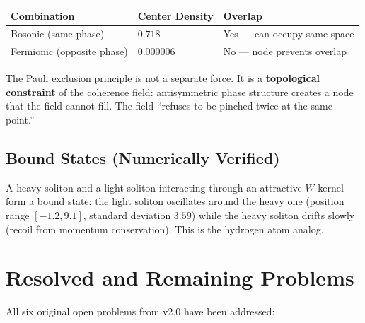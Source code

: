 \documentclass[11pt, a4paper]{article}
\begin{document}
\begin{center}
\begin{tabular}{@{}lll@{}}
\toprule
\textbf{Combination} & \textbf{Center Density} & \textbf{Overlap} \\
\midrule
Bosonic (same phase)     & $0.718$    & Yes --- can occupy same space \\
Fermionic (opposite phase) & $0.000006$ & No --- node prevents overlap \\
\bottomrule
\end{tabular}
\end{center}

The Pauli exclusion principle is not a separate force. It is a
\textbf{topological constraint} of the coherence field: antisymmetric
phase structure creates a node that the field cannot fill. The field
``refuses to be pinched twice at the same point.''

\subsection{Bound States (Numerically Verified)}

A heavy soliton and a light soliton interacting through an attractive
$W$ kernel form a bound state: the light soliton oscillates around
the heavy one (position range $[-1.2, 9.1]$, standard deviation $3.59$)
while the heavy soliton drifts slowly (recoil from momentum
conservation). This is the hydrogen atom analog.

\section{Resolved and Remaining Problems}

All six original open problems from v2.0 have been addressed:
\end{document}
